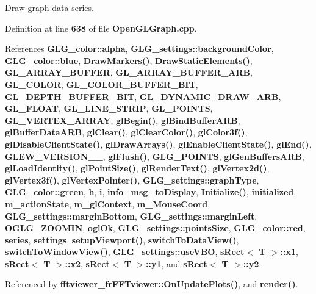 Draw graph data series. 



Definition at line {\bf 638} of file {\bf Open\+G\+L\+Graph.\+cpp}.



References {\bf G\+L\+G\+\_\+color\+::alpha}, {\bf G\+L\+G\+\_\+settings\+::background\+Color}, {\bf G\+L\+G\+\_\+color\+::blue}, {\bf Draw\+Markers()}, {\bf Draw\+Static\+Elements()}, {\bf G\+L\+\_\+\+A\+R\+R\+A\+Y\+\_\+\+B\+U\+F\+F\+ER}, {\bf G\+L\+\_\+\+A\+R\+R\+A\+Y\+\_\+\+B\+U\+F\+F\+E\+R\+\_\+\+A\+RB}, {\bf G\+L\+\_\+\+C\+O\+L\+OR}, {\bf G\+L\+\_\+\+C\+O\+L\+O\+R\+\_\+\+B\+U\+F\+F\+E\+R\+\_\+\+B\+IT}, {\bf G\+L\+\_\+\+D\+E\+P\+T\+H\+\_\+\+B\+U\+F\+F\+E\+R\+\_\+\+B\+IT}, {\bf G\+L\+\_\+\+D\+Y\+N\+A\+M\+I\+C\+\_\+\+D\+R\+A\+W\+\_\+\+A\+RB}, {\bf G\+L\+\_\+\+F\+L\+O\+AT}, {\bf G\+L\+\_\+\+L\+I\+N\+E\+\_\+\+S\+T\+R\+IP}, {\bf G\+L\+\_\+\+P\+O\+I\+N\+TS}, {\bf G\+L\+\_\+\+V\+E\+R\+T\+E\+X\+\_\+\+A\+R\+R\+AY}, {\bf gl\+Begin()}, {\bf gl\+Bind\+Buffer\+A\+RB}, {\bf gl\+Buffer\+Data\+A\+RB}, {\bf gl\+Clear()}, {\bf gl\+Clear\+Color()}, {\bf gl\+Color3f()}, {\bf gl\+Disable\+Client\+State()}, {\bf gl\+Draw\+Arrays()}, {\bf gl\+Enable\+Client\+State()}, {\bf gl\+End()}, {\bf G\+L\+E\+W\+\_\+\+V\+E\+R\+S\+I\+O\+N\+\_\+\_}, {\bf gl\+Flush()}, {\bf G\+L\+G\+\_\+\+P\+O\+I\+N\+TS}, {\bf gl\+Gen\+Buffers\+A\+RB}, {\bf gl\+Load\+Identity()}, {\bf gl\+Point\+Size()}, {\bf gl\+Render\+Text()}, {\bf gl\+Vertex2d()}, {\bf gl\+Vertex3f()}, {\bf gl\+Vertex\+Pointer()}, {\bf G\+L\+G\+\_\+settings\+::graph\+Type}, {\bf G\+L\+G\+\_\+color\+::green}, {\bf h}, {\bf i}, {\bf info\+\_\+msg\+\_\+to\+Display}, {\bf Initialize()}, {\bf initialized}, {\bf m\+\_\+action\+State}, {\bf m\+\_\+gl\+Context}, {\bf m\+\_\+\+Mouse\+Coord}, {\bf G\+L\+G\+\_\+settings\+::margin\+Bottom}, {\bf G\+L\+G\+\_\+settings\+::margin\+Left}, {\bf O\+G\+L\+G\+\_\+\+Z\+O\+O\+M\+IN}, {\bf ogl\+Ok}, {\bf G\+L\+G\+\_\+settings\+::points\+Size}, {\bf G\+L\+G\+\_\+color\+::red}, {\bf series}, {\bf settings}, {\bf setup\+Viewport()}, {\bf switch\+To\+Data\+View()}, {\bf switch\+To\+Window\+View()}, {\bf G\+L\+G\+\_\+settings\+::use\+V\+BO}, {\bf s\+Rect$<$ T $>$\+::x1}, {\bf s\+Rect$<$ T $>$\+::x2}, {\bf s\+Rect$<$ T $>$\+::y1}, and {\bf s\+Rect$<$ T $>$\+::y2}.



Referenced by {\bf fftviewer\+\_\+fr\+F\+F\+Tviewer\+::\+On\+Update\+Plots()}, and {\bf render()}.



